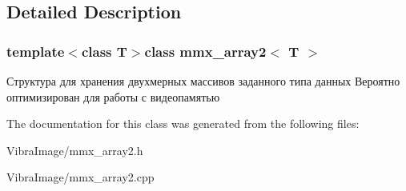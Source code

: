 \subsection{Detailed Description}
\subsubsection*{template$<$class T$>$class mmx\+\_\+array2$<$ T $>$}

Структура для хранения двухмерных массивов заданного типа данных Вероятно оптимизирован для работы с видеопамятью 



The documentation for this class was generated from the following files\+:\begin{DoxyCompactItemize}
\item 
Vibra\+Image/mmx\+\_\+array2.\+h\item 
Vibra\+Image/mmx\+\_\+array2.\+cpp\end{DoxyCompactItemize}
